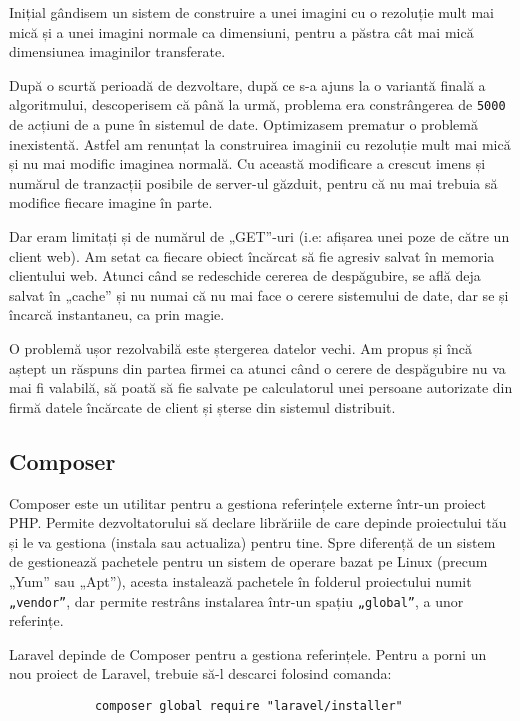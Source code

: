 		Inițial gândisem un sistem de construire a unei imagini cu o rezoluție mult mai mică și a unei imagini normale ca dimensiuni, pentru a păstra cât mai mică dimensiunea imaginilor transferate.

		După o scurtă perioadă de dezvoltare, după ce s-a ajuns la o variantă finală a algoritmului, descoperisem că până la urmă, problema era constrângerea de \verb|5000| de acțiuni de a pune în sistemul de date.
		Optimizasem prematur o problemă inexistentă.
		Astfel am renunțat la construirea imaginii cu rezoluție mult mai mică și nu mai modific imaginea normală.
		Cu această modificare a crescut imens și numărul de tranzacții posibile de server-ul găzduit, pentru că nu mai trebuia să modifice fiecare imagine în parte.

		Dar eram limitați și de numărul de „GET”-uri (i.e: afișarea unei poze de către un client web).
		Am setat ca fiecare obiect încărcat să fie agresiv salvat în memoria clientului web.
		Atunci când se redeschide cererea de despăgubire, se află deja salvat în „cache” și nu numai că nu mai face o cerere sistemului de date, dar se și încarcă instantaneu, ca prin magie.

		O problemă ușor rezolvabilă este ștergerea datelor vechi.
		Am propus și încă aștept un răspuns din partea firmei ca atunci când o cerere de despăgubire nu va mai fi valabilă, să poată să fie salvate pe calculatorul unei persoane autorizate din firmă datele încărcate de client și șterse din sistemul distribuit.

	\subsection{Composer}

		Composer este un utilitar pentru a gestiona referințele externe într-un proiect PHP.
		Permite dezvoltatorului să declare librăriile de care depinde proiectului tău și le va gestiona (instala sau actualiza) pentru tine.
		Spre diferență de un sistem de gestionează pachetele pentru un sistem de operare bazat pe Linux (precum „Yum” sau „Apt”), acesta instalează pachetele în folderul proiectului numit \verb|„vendor”|, dar permite restrâns instalarea într-un spațiu \verb|„global”|, a unor referințe. \cite{composer}

		Laravel depinde de Composer pentru a gestiona referințele.
		Pentru a porni un nou proiect de Laravel, trebuie să-l descarci folosind comanda:
		\begin{verbatim}
			composer global require "laravel/installer"
		\end{verbatim}

